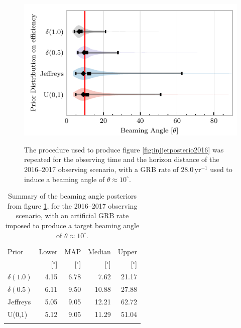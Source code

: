 \documentclass[twocolumn]{aastex61}
\newcommand{\yr}{\mathrm{yr}}
\begin{document}
\begin{figure}%
\centering
{\includegraphics[width=\linewidth]{O2_injections_violin.pdf}}
\caption{The procedure used to produce figure \ref{fig:injjetposterio2016} was repeated for the observing time and the horizon distance of the 2016--2017 observing scenario, with a GRB rate of $28.0 \,\yr^{-1}$ used to induce a beaming angle of $\theta \approx 10^{\circ}$.
  \label{fig:injjetposterio2017}}
\end{figure}
\begin{table}
  \centering
  \begin{tabular}{lrrrr}
    \toprule
    Prior & Lower & MAP & Median & Upper\\
          & [$^\circ$] & [$^\circ$]& [$^\circ$]& [$^\circ$] \\
    \colrule
    $\delta(1.0)$ & 4.15	 & 6.78	 & 7.62	 & 21.17	 \\
    $\delta(0.5)$ & 6.11	 & 9.50	 & 10.88	 & 27.88	 \\
    Jeffreys & 5.05	 & 9.05	 & 12.21	 & 62.72	 \\
    U(0,1) & 5.12	 & 9.05	 & 11.29	 & 51.04	 \\
    \botrule
\end{tabular}
\caption{Summary of the beaming angle posteriors from figure
  \ref{fig:injjetposterio2017}, for the 2016--2017 observing scenario,
  with an artificial GRB rate imposed to produce a target beaming
  angle of $\theta \approx 10^{\circ}$.}
  \label{tab:summaryinj2016}
\end{table}
\end{document}

